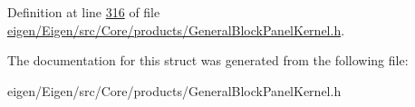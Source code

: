 Definition at line \hyperlink{eigen_2_eigen_2src_2_core_2products_2_general_block_panel_kernel_8h_source_l00316}{316} of file \hyperlink{eigen_2_eigen_2src_2_core_2products_2_general_block_panel_kernel_8h_source}{eigen/\+Eigen/src/\+Core/products/\+General\+Block\+Panel\+Kernel.\+h}.



The documentation for this struct was generated from the following file\+:\begin{DoxyCompactItemize}
\item 
eigen/\+Eigen/src/\+Core/products/\+General\+Block\+Panel\+Kernel.\+h\end{DoxyCompactItemize}
